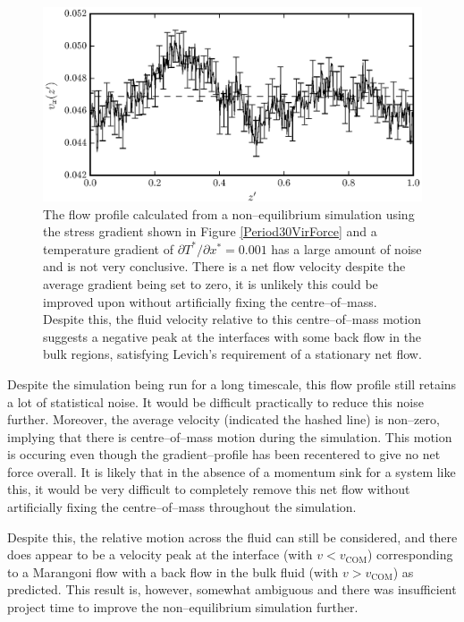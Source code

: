 \begin{figure}[h]
\centering
\includegraphics[scale=0.8]{Period30VirFlow}
\caption{The flow profile calculated from a non--equilibrium simulation using the stress gradient shown in Figure \ref{Period30VirForce} and a temperature gradient of $\partial T^{*} / \partial x^{*} = 0.001$ has a large amount of noise and is not very conclusive.
There is a net flow velocity despite the average gradient being set to zero, it is unlikely this could be improved upon without artificially fixing the centre--of--mass.
Despite this, the fluid velocity relative to this centre--of--mass motion suggests a negative peak at the interfaces with some back flow in the bulk regions, satisfying Levich's requirement of a stationary net flow.\cite{Levich}
 }
\label{Period30VirFlow}
\end{figure}

Despite the simulation being run for a long timescale, this flow profile still retains a lot of statistical noise.
It would be difficult practically to reduce this noise further.
Moreover, the average velocity (indicated the hashed line) is non--zero, implying that there is centre--of--mass motion during the simulation.
This motion is occuring even though the gradient--profile has been recentered to give no net force overall.
It is likely that in the absence of a momentum sink for a system like this, it would be very difficult to completely remove this net flow without artificially fixing the centre--of--mass throughout the simulation.

Despite this, the relative motion across the fluid can still be considered, and there does appear to be a velocity peak at the interface (with $v < v_{\mathrm{COM}}$) corresponding to a Marangoni flow with a back flow in the bulk fluid (with $v > v_{\mathrm{COM}}$) as predicted.
This result is, however, somewhat ambiguous and there was insufficient project time to improve the non--equilibrium simulation further.

